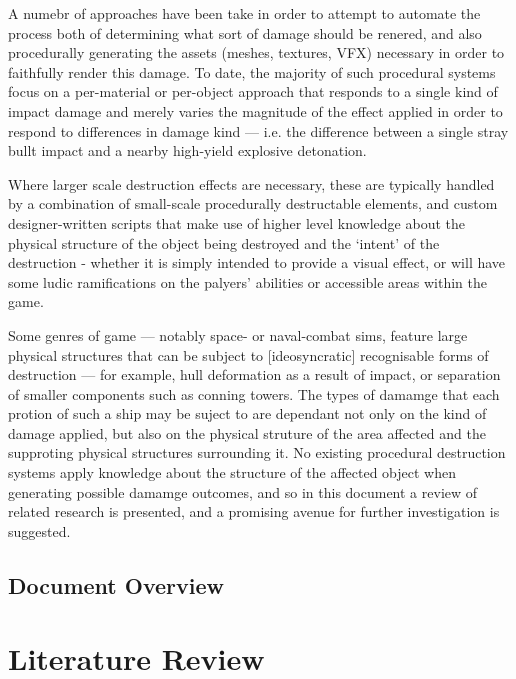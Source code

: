 \documentclass[11pt]{report}
\begin{document}
	A numebr of approaches have been take in order to attempt to automate the process both of determining what sort of damage should be renered, and also procedurally generating the assets (meshes, textures, VFX) necessary in order to faithfully render this damage. To date, the majority of such procedural systems focus on a per-material or per-object approach that responds to a single kind of impact damage and merely varies the magnitude of the effect applied in order to respond to differences in damage kind --- i.e. the difference between a single stray bullt impact and a nearby high-yield explosive detonation.

	Where larger scale destruction effects are necessary, these are typically handled by a combination of small-scale procedurally destructable elements, and custom designer-written scripts that make use of higher level knowledge about the physical structure of the object being destroyed and the `intent' of the destruction - whether it is simply intended to provide a visual effect, or will have some ludic ramifications on the palyers' abilities or accessible areas within the game.

	Some genres of game --- notably space- or naval-combat sims, feature large physical structures that can be subject to [ideosyncratic] recognisable forms of destruction --- for example, hull deformation as a result of impact, or separation of smaller components such as conning towers. The types of damamge that each protion of such a ship may be suject to are dependant not only on the kind of damage applied, but also on the physical struture of the area affected and the supproting physical structures surrounding it. No existing procedural destruction systems apply knowledge about the structure of the affected object when generating possible damamge outcomes, and so in this document a review of related research is presented, and a promising avenue for further investigation is suggested.

	\section{Document Overview}

\chapter{Literature Review}
\end{document}
